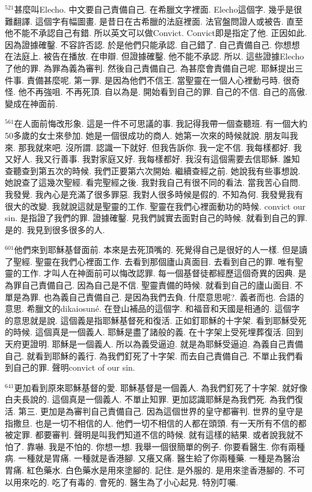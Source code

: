 \documentclass{book}
\begin{document}
$^{521}$甚麼叫Elecho.
中文要自己責備自己.
在希臘文字裡面.
Elecho這個字.
幾乎是很難翻譯.
這個字有幅圖畫.
是昔日在古希臘的法庭裡面.
法官盤問證人或被告.
直至他不能不承認自己有錯.
所以英文可以做Convict.
Convict即是指定了他.
正因如此.
因為證據確鑿.
不容許否認.
於是他們只能承認.
自己錯了.
自己責備自己.
你想想在法庭上.
被告在播放.
在申辯.
但證據確鑿.
他不能不承認.
所以.
這些證據Elecho了他的罪.
為罪為義為審判.
然後自己責備自己.
為甚麼會責備自己呢.
耶穌提出三件事.
責備甚麼呢.
第一罪.
是因為他們不信王.
當聖靈在一個人心裡動弓時.
很奇怪.
他不再強咀.
不再死頂.
自以為是.
開始看到自己的罪.
自己的不信.
自己的高傲.
變成在神面前.

$^{561}$在人面前悔改形象.
這是一件不可思議的事.
我記得我帶一個查聽班.
有一個大約50多歲的女士來參加.
她是一個很成功的商人.
她第一次來的時候就說.
朋友叫我來.
那我就來吧.
沒所謂.
認識一下就好.
但我告訴你.
我一定不信.
我每樣都好.
我又好人.
我又行善事.
我對家庭又好.
我每樣都好.
我沒有這個需要去信耶穌.
誰知查聽查到第五次的時候.
我們正要第六次開始.
繼續查經之前.
她說我有些事想說.
她說查了這幾次聖經.
看完聖經之後.
我對我自己有很不同的看法.
當我苦心自問.
我發覺.
我內心是充滿了很多罪惡.
我對人很多時候是假的.
不知為何.
我發覺我有很大的改變.
我就說這就是聖靈的工作.
聖靈在我們心裡面動功的時候.
convict our sin.
是指證了我們的罪.
證據確鑿.
見我們誠實去面對自己的時候.
就看到自己的罪.
是的.
我見到很多很多的人.

$^{601}$他們來到耶穌基督面前.
本來是去死頂嘴的.
死覺得自己是很好的人一樣.
但是讀了聖經.
聖靈在我們心裡面工作.
去看到那個廬山真面目.
去看到自己的罪.
唯有聖靈的工作.
才叫人在神面前可以悔改認罪.
每一個基督徒都經歷這個奇異的因典.
是為罪自己責備自己.
因為自己是不信.
聖靈責備的時候.
就看到自己的廬山面目.
不單是為罪.
也為義自己責備自己.
是因為我們去負.
什麼意思呢?.
義者而也.
合語的意思.
希臘文的dikaiosuné.
在登山補品的這個字.
和福音和天國是相通的.
這個字的意思就是說.
這個義是指耶穌基督死和復活.
正如釘耶穌的十字架.
看到耶穌受死的時候.
這個真是一個義人.
耶穌是盡了諸般的義.
在十字架上受死埋葬復活.
回到天府更證明.
耶穌是一個義人.
所以為義受逼迫.
就是為耶穌受逼迫.
為義自己責備自己.
就看到耶穌的義行.
為我們釘死了十字架.
而去自己責備自己.
不單止我們看到自己的罪.
聲明convict of our sin.

$^{641}$更加看到原來耶穌基督的愛.
耶穌基督是一個義人.
為我們釘死了十字架.
就好像白夫長說的.
這個真是一個義人.
不單止知罪.
更加認識耶穌是為我們死.
為我們復活.
第三.
更加是為審判自己責備自己.
因為這個世界的皇守都審判.
世界的皇守是指撒旦.
也是一切不相信的人.
他們一切不相信的人都在頭頭.
有一天所有不信的都被定罪.
都要審判.
聲明是叫我們知道不信的時候.
就有這樣的結果.
或者說我就不怕了.
靠嚇.
我是不怕的.
你想一想.
我舉一個很簡單的例子.
你要看醫生.
你有兩種病.
一種就是胃痛.
一種就是香港腳.
又癢又痛.
醫生給了你兩種藥.
一種是為醫治胃痛.
紅色藥水.
白色藥水是用來塗腳的.
記住.
是外服的.
是用來塗香港腳的.
不可以用來吃的.
吃了有毒的.
會死的.
醫生為了小心起見.
特別叮囑.
\end{document}
